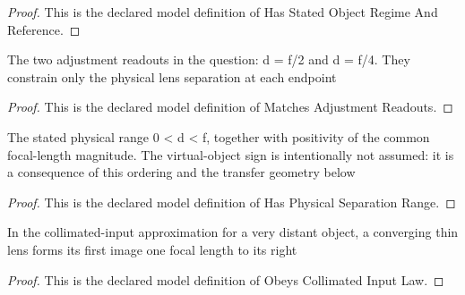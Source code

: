 \begin{proof}
  This is the declared model definition of Has Stated Object Regime And Reference.
\end{proof}
\begin{definition}
  \label{def:physics:phyx-mini-0078:phyxminiproblems-problemphyxmini0078-matchesadjustmentreadouts}
  The two adjustment readouts in the question: d = f/2 and d = f/4. They constrain only the physical lens separation at each endpoint
\end{definition}
\begin{proof}
  This is the declared model definition of Matches Adjustment Readouts.
\end{proof}
\begin{definition}
  \label{def:physics:phyx-mini-0078:phyxminiproblems-problemphyxmini0078-hasphysicalseparationrange}
  The stated physical range 0 < d < f, together with positivity of the common focal-length magnitude. The virtual-object sign is intentionally not assumed: it is a consequence of this ordering and the transfer geometry below
\end{definition}
\begin{proof}
  This is the declared model definition of Has Physical Separation Range.
\end{proof}
\begin{definition}
  \label{def:physics:phyx-mini-0078:phyxminiproblems-problemphyxmini0078-obeyscollimatedinputlaw}
  In the collimated-input approximation for a very distant object, a converging thin lens forms its first image one focal length to its right
\end{definition}
\begin{proof}
  This is the declared model definition of Obeys Collimated Input Law.
\end{proof}
